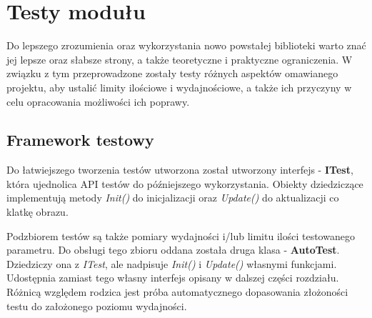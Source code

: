 \chapter{Testy modułu}
	Do lepszego zrozumienia oraz wykorzystania nowo powstałej biblioteki warto znać jej lepsze oraz słabsze strony, a także teoretyczne i praktyczne ograniczenia. W związku z tym przeprowadzone zostały testy różnych aspektów omawianego projektu, aby ustalić limity ilościowe i wydajnościowe, a także ich przyczyny w celu opracowania możliwości ich poprawy.
	
	\section{Framework testowy}
	Do łatwiejszego tworzenia testów utworzona został utworzony interfejs - \textbf{ITest}, która ujednolica API testów do późniejszego wykorzystania. Obiekty dziedziczące implementują metody \textit{Init()} do inicjalizacji oraz \textit{Update()} do aktualizacji co klatkę obrazu.
	
	Podzbiorem testów są także pomiary wydajności i/lub limitu ilości testowanego parametru. Do obsługi tego zbioru oddana została druga klasa - \textbf{AutoTest}. Dziedziczy ona z \textit{ITest}, ale nadpisuje \textit{Init()} i \textit{Update()} własnymi funkcjami. Udostępnia zamiast tego własny interfejs opisany w dalszej części rozdziału. Różnicą względem rodzica jest próba automatycznego dopasowania złożoności testu do założonego poziomu wydajności. 
	
